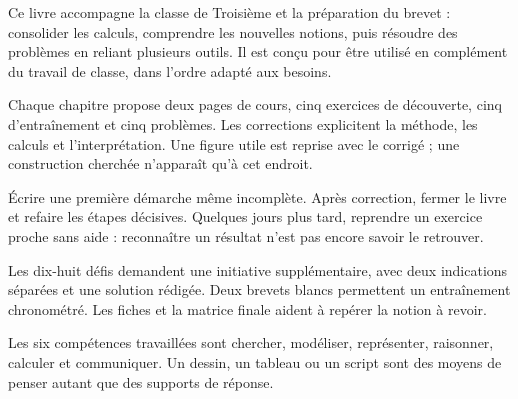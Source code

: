 \clearpage\thispagestyle{otFront}\label{avant-propos}\fontsize{11}{15}\selectfont

Ce livre accompagne la classe de Troisième et la préparation du brevet :
consolider les calculs, comprendre les nouvelles notions, puis résoudre des
problèmes en reliant plusieurs outils. Il est conçu pour être utilisé en
complément du travail de classe, dans l’ordre adapté aux besoins.\par\medskip
\begin{savoirfaire}Chaque chapitre propose deux pages de cours, cinq exercices de découverte, cinq d’entraînement et cinq problèmes. Les corrections explicitent la méthode, les calculs et l’interprétation. Une figure utile est reprise avec le corrigé ; une construction cherchée n’apparaît qu’à cet endroit.\end{savoirfaire}
\begin{savoirfaire}Écrire une première démarche même incomplète. Après correction, fermer le livre et refaire les étapes décisives. Quelques jours plus tard, reprendre un exercice proche sans aide : reconnaître un résultat n’est pas encore savoir le retrouver.\end{savoirfaire}
\begin{savoirfaire}Les dix-huit défis demandent une initiative supplémentaire, avec deux indications séparées et une solution rédigée. Deux brevets blancs permettent un entraînement chronométré. Les fiches et la matrice finale aident à repérer la notion à revoir.\end{savoirfaire}
Les six compétences travaillées sont chercher, modéliser, représenter,
raisonner, calculer et communiquer. Un dessin, un tableau ou un script sont
des moyens de penser autant que des supports de réponse.

\clearpage
